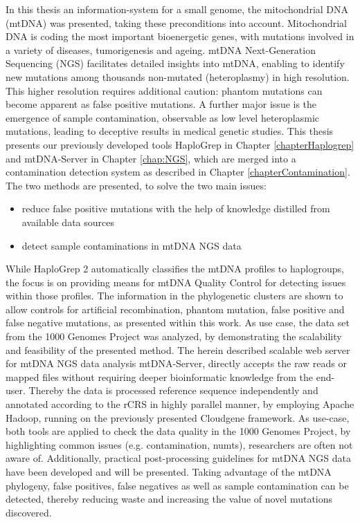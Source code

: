 In this thesis an information-system for a small genome, the mitochondrial DNA (mtDNA) was presented, taking these preconditions into account. Mitochondrial DNA is coding the most important bioenergetic genes, with mutations involved in a variety of diseases, tumorigenesis and ageing. mtDNA Next-Generation Sequencing (NGS) facilitates detailed insights into mtDNA, enabling to identify new mutations among thousands non-mutated (heteroplasmy) in high resolution. This higher resolution requires additional caution: phantom mutations can become apparent as false positive mutations. A further major issue is the emergence of sample contamination, observable as low level heteroplasmic mutations, leading to deceptive results in medical genetic studies.
This thesis presents our previously developed tools HaploGrep in Chapter \ref{chapterHaplogrep} and mtDNA-Server in Chapter \ref{chap:NGS}, which are merged into a contamination detection system as described in Chapter \ref{chapterContamination}. The two methods are presented, to solve the two main issues:
\begin{itemize}
\item reduce false positive mutations with the help of knowledge distilled from available data sources  
\item detect sample contaminations in mtDNA NGS data
\end{itemize}
While HaploGrep 2 automatically classifies the mtDNA profiles to haplogroups, the focus is on providing means for mtDNA Quality Control for detecting issues within those profiles. The information in the phylogenetic clusters are shown to allow controls for artificial recombination, phantom mutation, false positive and false negative mutations, as presented within this work. As use case, the data set from the 1000 Genomes Project was analyzed, by demonstrating the scalability and feasibility of the presented method.
The herein described scalable web server for mtDNA NGS data analysis mtDNA-Server, directly accepts the raw reads or mapped files without requiring deeper bioinformatic knowledge from the end-user. Thereby the data is processed reference sequence independently and annotated according to the rCRS in highly parallel manner, by employing Apache Hadoop, running on the previously presented Cloudgene framework. 
As use-case, both tools are applied to check the data quality in the 1000 Genomes Project, by highlighting common issues (e.g. contamination, numts), researchers are often not aware of. Additionally, practical post-processing guidelines for mtDNA NGS data have been developed and will be presented. Taking advantage of the mtDNA phylogeny, false positives, false negatives as well as sample contamination can be detected, thereby reducing waste and increasing the value of novel mutations discovered.
